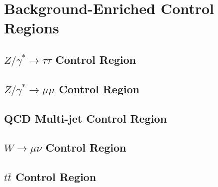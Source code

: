 \section{Background-Enriched Control Regions}

\subsection{\texorpdfstring{$Z/\gamma^{*} \rightarrow \tau\tau$}{Drell-Yan To Di-tau} Control Region}

\subsection{\texorpdfstring{$Z/\gamma^{*} \rightarrow \mu\mu$}{Drell-Yan To Di-Muon} Control Region}

\subsection{QCD Multi-jet Control Region}

\subsection{\texorpdfstring{$W \rightarrow \mu\nu$}{W To Muon Plus Neutrino} Control Region}

\subsection{\texorpdfstring{$t\overline{t}$}{TTBar} Control Region}

